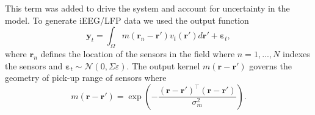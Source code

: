 \documentclass[12pt]{iopart}		%
\begin{document}
This term was added to drive the system and account for uncertainty in the model. To generate iEEG/LFP data we used the output function 
\begin{equation}
	\mathbf{y}_t = \int_{\Omega}{m\left(\mathbf{r}_n-\mathbf{r}'\right)v_t\left(\mathbf{r}'\right)d\mathbf{r}'} + \boldsymbol{\varepsilon}_t,
\end{equation}
where $\mathbf{r}_n$ defines the location of the sensors in the field where $n=1,...,N$ indexes the sensors and $\boldsymbol{\varepsilon}_t \sim \mathcal{N}\left(0,\Sigma{\varepsilon}\right)$. The output kernel $m(\mathbf{r}-\mathbf{r}')$ governs the geometry of pick-up range of sensors where
\begin{equation}
	m\left(\mathbf{r}-\mathbf{r}'\right) = \exp{\left(-\frac{(\mathbf{r}-\mathbf{r}')^\top(\mathbf{r}-\mathbf{r}')}{\sigma_m^2}\right)}.
\end{equation}
\end{document}
